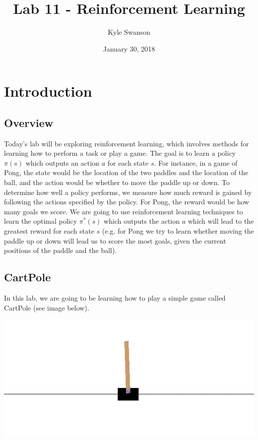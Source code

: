 \documentclass{article}
\title{Lab 11 - Reinforcement Learning}
\author{Kyle Swanson}
\date{January 30, 2018}
\begin{document}
\maketitle

\section{Introduction}

\subsection{Overview}

Today's lab will be exploring reinforcement learning, which involves methods for learning how to perform a task or play a game. The goal is to learn a policy $\pi(s)$ which outputs an action $a$ for each state $s$. For instance, in a game of Pong, the state would be the location of the two paddles and the location of the ball, and the action would be whether to move the paddle up or down. To determine how well a policy performs, we measure how much reward is gained by following the actions specified by the policy. For Pong, the reward would be how many goals we score. We are going to use reinforcement learning techniques to learn the optimal policy $\pi^*(s)$ which outputs the action $a$ which will lead to the greatest reward for each state $s$ (e.g. for Pong we try to learn whether moving the paddle up or down will lead us to score the most goals, given the current positions of the paddle and the ball).

\subsection{CartPole}

In this lab, we are going to be learning how to play a simple game called CartPole (see image below).

\noindent
\includegraphics[width=\textwidth]{cartpole.png}
\end{document}
